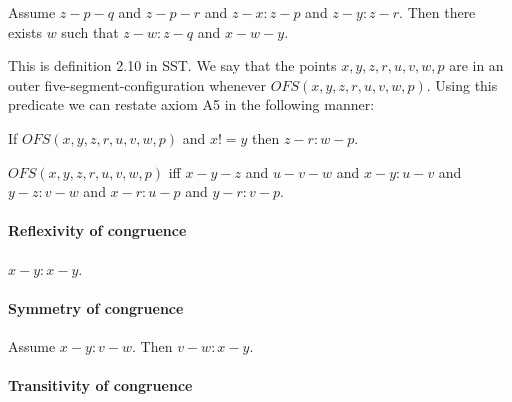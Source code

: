 \documentclass{article}
\begin{document}
  \begin{forthel}
    \begin{axiom}[CA]
      Assume $z-p-q$ and $z-p-r$ and $z-x : z-p$ and $z-y : z-r$. Then there exists $w$ such that $z-w : z-q$ and $x-w-y$.
    \end{axiom}
  \end{forthel}


  This is definition 2.10 in SST. We say that the points $x,y,z,r,u,v,w,p$ are in an outer five-segment-configuration whenever $OFS(x,y,z,r,u,v,w,p)$. Using this predicate we can restate axiom A5 in the following manner:

  \begin{axiom}[A5']
    If $OFS(x,y,z,r,u,v,w,p)$ and $x != y$ then $z-r : w-p$.
  \end{axiom}

  \begin{forthel}
    \begin{definition}[OFS]
      $OFS(x,y,z,r,u,v,w,p)$ iff $x-y-z$ and $u-v-w$ and $x-y : u-v$ and $y-z : v-w$ and $x-r : u-p$ and $y-r : v-p$.
    \end{definition}
  \end{forthel}


  \paragraph{Reflexivity of congruence}

  \begin{forthel}
    \begin{lemma}[L2_1]
      $x-y : x-y$.
    \end{lemma}
  \end{forthel}


  \paragraph{Symmetry of congruence}

  \begin{forthel}
    \begin{lemma}[L2_2]
      Assume $x-y : v-w$. Then $v-w : x-y$.
    \end{lemma}
  \end{forthel}


  \paragraph{Transitivity of congruence}
\end{document}
